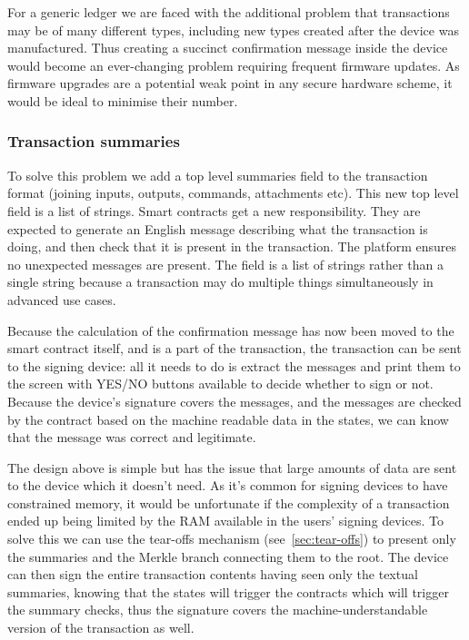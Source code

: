 \documentclass{article}
\begin{document}
For a generic ledger we are faced with the additional problem that transactions may be of many different types,
including new types created after the device was manufactured. Thus creating a succinct confirmation message inside
the device would become an ever-changing problem requiring frequent firmware updates. As firmware upgrades are a
potential weak point in any secure hardware scheme, it would be ideal to minimise their number.

\subsubsection{Transaction summaries}

To solve this problem we add a top level summaries field to the transaction format (joining inputs, outputs,
commands, attachments etc). This new top level field is a list of strings. Smart contracts get a new
responsibility. They are expected to generate an English message describing what the transaction is doing, and then
check that it is present in the transaction. The platform ensures no unexpected messages are present. The field is
a list of strings rather than a single string because a transaction may do multiple things simultaneously in
advanced use cases.

Because the calculation of the confirmation message has now been moved to the smart contract itself, and is a part
of the transaction, the transaction can be sent to the signing device: all it needs to do is extract the messages
and print them to the screen with YES/NO buttons available to decide whether to sign or not. Because the device's
signature covers the messages, and the messages are checked by the contract based on the machine readable data in
the states, we can know that the message was correct and legitimate.

The design above is simple but has the issue that large amounts of data are sent to the device which it doesn't
need. As it's common for signing devices to have constrained memory, it would be unfortunate if the complexity of a
transaction ended up being limited by the RAM available in the users' signing devices. To solve this we can use the
tear-offs mechanism (see~\cref{sec:tear-offs}) to present only the summaries and the Merkle branch connecting them
to the root. The device can then sign the entire transaction contents having seen only the textual summaries,
knowing that the states will trigger the contracts which will trigger the summary checks, thus the signature covers
the machine-understandable version of the transaction as well.
\end{document}
